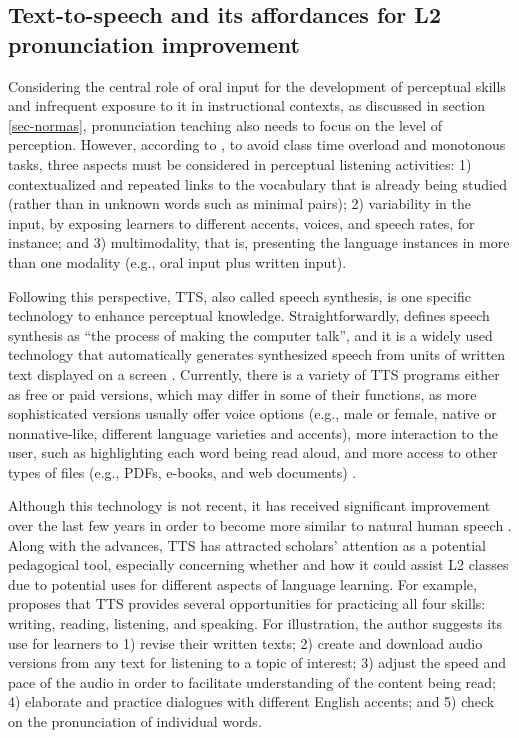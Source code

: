 \documentclass[english]{textolivre}
\begin{document}
\subsection{Text-to-speech and its affordances for L2 pronunciation improvement}\label{sec-formato}
Considering the central role of oral input for the development of perceptual skills and infrequent exposure to it in instructional contexts, as discussed in section \ref{sec-normas}, pronunciation teaching also needs to focus on the level of perception. However, according to \textcite{darcy_powerful_2018}, to avoid class time overload and monotonous tasks, three aspects must be considered in perceptual listening activities: 1) contextualized and repeated links to the vocabulary that is already being studied (rather than in unknown words such as minimal pairs); 2) variability in the input, by exposing learners to different accents, voices, and speech rates, for instance; and 3) multimodality, that is, presenting the language instances in more than one modality (e.g., oral input plus written input).

Following this perspective, TTS, also called speech synthesis, is one specific technology to enhance perceptual knowledge. Straightforwardly, \textcite[p. 5846]{handley_text--speech_2013} defines speech synthesis as “the process of making the computer talk”, and it is a widely used technology that automatically generates synthesized speech from units of written text displayed on a screen \cite{liakin_mobilizing_2017}. Currently, there is a variety of TTS programs either as free or paid versions, which may differ in some of their functions, as more sophisticated versions usually offer voice options (e.g., male or female, native or nonnative-like, different language varieties and accents), more interaction to the user, such as highlighting each word being read aloud, and more access to other types of files (e.g., PDFs, e-books, and web documents) \cite{moon_2012}.

Although this technology is not recent, it has received significant improvement over the last few years in order to become more similar to natural human speech \cite{handley_text--speech_2013, liakin_mobilizing_2017, moon_2012}. Along with the advances, TTS has attracted scholars’ attention as a potential pedagogical tool, especially concerning whether and how it could assist L2 classes due to potential uses for different aspects of language learning. For example, \textcite{moon_2012} proposes that TTS provides several opportunities for practicing all four skills: writing, reading, listening, and speaking. For illustration, the author suggests its use for learners to 1) revise their written texts; 2) create and download audio versions from any text for listening to a topic of interest; 3) adjust the speed and pace of the audio in order to facilitate understanding of the content being read; 4) elaborate and practice dialogues with different English accents; and 5) check on the pronunciation of individual words.
\end{document}
